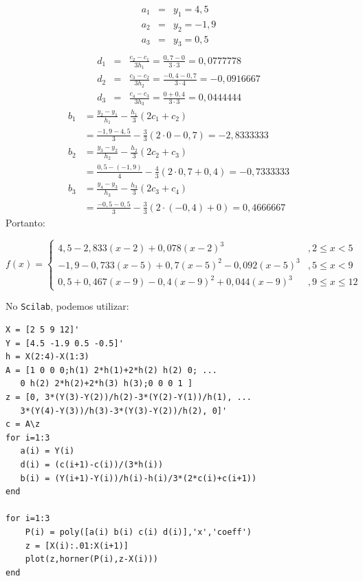 \begin{sol}
\begin{eqnarray*}
a_1&=&y_1=4,5\\
a_2&=&y_2=-1,9\\
a_3&=&y_3=0,5\\
\end{eqnarray*}
\begin{eqnarray*}
d_1&=&\frac{c_{2}-c_1}{3h_1}=\frac{0,7-0}{3\cdot 3}=0,0777778\\
d_2&=&\frac{c_{3}-c_2}{3h_2}=\frac{-0,4-0,7}{3\cdot 4}=-0,0916667\\
d_3&=&\frac{c_{4}-c_3}{3h_3}=\frac{0+0,4}{3\cdot 3}=0,0444444
\end{eqnarray*}
\begin{align*}
b_1 &= \frac{y_{2}-y_1}{h_1}-\frac{h_1}{3}(2c_1+c_{2})\\
&= \frac{-1,9-4,5}{3}-\frac{3}{3}(2\cdot 0-0,7)=-2,8333333\\
b_2&= \frac{y_{3}-y_2}{h_2}-\frac{h_2}{3}(2c_2+c_{3})\\
&= \frac{0,5-(-1,9)}{4}-\frac{4}{3}(2\cdot 0,7+0,4)=-0,7333333\\
b_3&= \frac{y_{4}-y_3}{h_3}-\frac{h_3}{3}(2c_3+c_{4})\\
&= \frac{-0,5-0,5}{3}-\frac{3}{3}(2\cdot (-0,4)+0)=0,4666667
\end{align*}
Portanto:
\begin{small}
\begin{equation*}
f(x)=\left\{\begin{array}{ll}
4,5-2,833(x-2)+0,078(x-2)^3 &\!, 2\leq x<5\\
-1,9-0,733(x-5)+0,7(x-5)^2-0,092(x-5)^3 &\!, 5\leq x<9\\
0,5+0,467(x-9)-0,4(x-9)^2+0,044(x-9)^3 &\!, 9\leq x\leq 12
\end{array}\right.
\end{equation*}  
\end{small}

\ifisscilab
No \verb+Scilab+, podemos utilizar:
\begin{verbatim}
X = [2 5 9 12]'
Y = [4.5 -1.9 0.5 -0.5]'
h = X(2:4)-X(1:3)
A = [1 0 0 0;h(1) 2*h(1)+2*h(2) h(2) 0; ...
   0 h(2) 2*h(2)+2*h(3) h(3);0 0 0 1 ]
z = [0, 3*(Y(3)-Y(2))/h(2)-3*(Y(2)-Y(1))/h(1), ...
   3*(Y(4)-Y(3))/h(3)-3*(Y(3)-Y(2))/h(2), 0]'
c = A\z
for i=1:3
   a(i) = Y(i)
   d(i) = (c(i+1)-c(i))/(3*h(i))
   b(i) = (Y(i+1)-Y(i))/h(i)-h(i)/3*(2*c(i)+c(i+1))
end

for i=1:3
    P(i) = poly([a(i) b(i) c(i) d(i)],'x','coeff')
    z = [X(i):.01:X(i+1)]
    plot(z,horner(P(i),z-X(i)))
end
\end{verbatim}
\fi
\end{sol}

